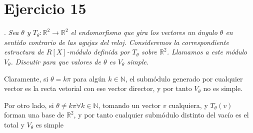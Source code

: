 \section{Ejercicio 15}.
\textit{Sea \(\theta\) y \(T_\theta: \mathbb{R}^2 \rightarrow \mathbb{R}^2\) el endomorfismo que gira los vectores un ángulo \(\theta\) en sentido contrario de las agujas del reloj. Consideremos la correspondiente estructura de \(R[X]\)-módulo definida por \(T_\theta\) sobre \(\mathbb{R}^2\). Llamamos a este módulo \(V_\theta\). Discutir para que valores de \(\theta\) es \(V_\theta\) simple.}

Claramente, si \(\theta = k\pi\) para algún \(k \in \mathbb{N}\),  el submódulo generado por cualquier vector es la recta vetorial con ese vector director, y por tanto \(V_\theta\) no es simple.

Por otro lado, si \(\theta \neq k\pi \forall k \in \mathbb{N}\), tomando un vector \(v\) cualquiera, y \(T_\theta(v)\) forman una base de \(\mathbb{R}^2\), y por tanto cualquier submódulo distinto del vacío es el total y \(V_\theta \) es simple
